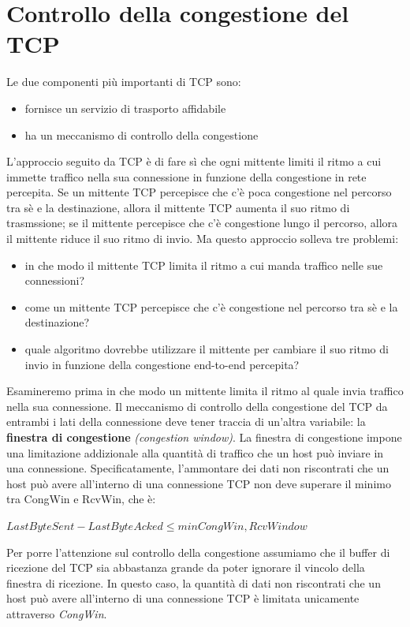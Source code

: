 \documentclass[11pt,a4paper]{book}
\begin{document}
\section{Controllo della congestione del TCP}
Le due componenti più importanti di TCP sono:
\begin{itemize}
	\item fornisce un servizio di trasporto affidabile
	\item ha un meccanismo di controllo della congestione
\end{itemize}
L'approccio seguito da TCP è di fare sì che ogni mittente limiti il ritmo a cui immette traffico nella sua connessione in funzione della congestione in rete percepita. Se un mittente TCP percepisce che c'è poca congestione nel percorso tra sè e la destinazione, allora il mittente TCP aumenta il suo ritmo di trasmssione; se il mittente percepisce che c'è congestione lungo il percorso, allora il mittente riduce il suo ritmo di invio. Ma questo approccio solleva tre problemi:
\begin{itemize}
	\item in che modo il mittente TCP limita il ritmo a cui manda traffico nelle sue connessioni?
	\item come un mittente TCP percepisce che c'è congestione nel percorso tra sè e la destinazione?
	\item quale algoritmo dovrebbe utilizzare il mittente per cambiare il suo ritmo di invio in funzione della congestione end-to-end percepita?
\end{itemize}
Esamineremo prima in che modo un mittente limita il ritmo al quale invia traffico nella sua connessione. Il meccanismo di controllo della congestione del TCP da entrambi i lati della connessione deve tener traccia di un'altra variabile: la \textbf{finestra di congestione} \textit{(congestion window)}. La finestra di congestione impone una limitazione addizionale alla quantità di traffico che un host può inviare in una connessione. Specificatamente, l'ammontare dei dati non riscontrati che un host può avere all'interno di una connessione TCP non deve superare il minimo tra CongWin e RcvWin, che è:
\begin{center}
	$LastByteSent - LastByteAcked \leq min{CongWin, RcvWindow}$
\end{center}
Per porre l'attenzione sul controllo della congestione assumiamo che il buffer di ricezione del TCP sia abbastanza grande da poter ignorare il vincolo della finestra di ricezione. In questo caso, la quantità di dati non riscontrati che un host può avere all'interno di una connessione TCP è limitata unicamente attraverso \emph{CongWin}. \\
\end{document}
